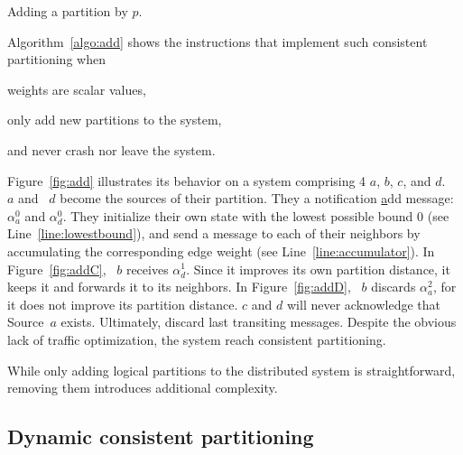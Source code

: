 \begin{algorithm}
  
  \caption{\label{algo:add}Adding a partition by \Process $p$.}
\end{algorithm}

 

Algorithm~\ref{algo:add} shows the instructions that implement such
consistent partitioning when
\begin{inparaenum}[(i)]
\item weights are scalar values,
\item \processes only add new partitions to the system,
\item and \processes never crash nor leave the system.
\end{inparaenum}
Figure~\ref{fig:add} illustrates its behavior on a system comprising 4
\processes $a$, $b$, $c$, and $d$. \Process~$a$ and \Process~$d$
become the sources of their partition. They \NAMEB a notification
\underline{a}dd message: $\alpha_a^0$ and $\alpha_d^0$. They
initialize their own state with the lowest possible bound $0$ (see
Line~\ref{line:lowestbound}), and send a message to each of their
neighbors by accumulating the corresponding edge weight (see
Line~\ref{line:accumulator}). In Figure~\ref{fig:addC}, \Process~$b$
receives $\alpha_{d}^{1}$. Since it improves its own partition
distance, it keeps it and forwards it to its neighbors. In
Figure~\ref{fig:addD}, \Process~$b$ discards $\alpha_{a}^{2}$, for it
does not improve its partition distance. \Processes $c$ and $d$ will
never acknowledge that Source~$a$ exists. Ultimately, \processes
discard last transiting messages. Despite the obvious lack of traffic
optimization, the system reach consistent partitioning.

While only adding logical partitions to the distributed system is
straightforward, removing them introduces additional complexity.

\subsection{Dynamic consistent partitioning}
\label{subsec:dynamic}


